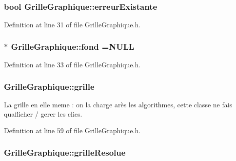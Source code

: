 \subsubsection[{erreur\+Existante}]{\setlength{\rightskip}{0pt plus 5cm}bool Grille\+Graphique\+::erreur\+Existante}\label{class_grille_graphique_a56518a83cba80e34d60133a50bad30e2}


Definition at line 31 of file Grille\+Graphique.\+h.

\hypertarget{class_grille_graphique_a3a161cd8377578a6f4dc1b5d234cb090}{}
\subsubsection[{fond}]{$\ast$ Grille\+Graphique\+::fond ={\bf N\+U\+L\+L}}\label{class_grille_graphique_a3a161cd8377578a6f4dc1b5d234cb090}


Definition at line 33 of file Grille\+Graphique.\+h.

\hypertarget{class_grille_graphique_a8577c2dd3bbfc9b58bfd88adcf484eb3}{}
\subsubsection[{grille}]{ Grille\+Graphique\+::grille}\label{class_grille_graphique_a8577c2dd3bbfc9b58bfd88adcf484eb3}


La grille en elle meme \+: on la charge arès les algorithmes, cette classe ne fais qu\textquotesingle{}afficher / gerer les clics. 



Definition at line 59 of file Grille\+Graphique.\+h.

\hypertarget{class_grille_graphique_a0a784721612498e233906223293697c9}{}
\subsubsection[{grille\+Resolue}]{ Grille\+Graphique\+::grille\+Resolue}\label{class_grille_graphique_a0a784721612498e233906223293697c9}


